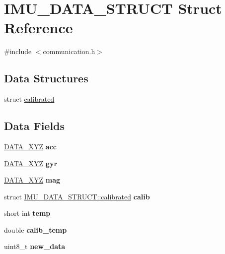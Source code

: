 \hypertarget{structIMU__DATA__STRUCT}{
\section{IMU\_\-DATA\_\-STRUCT Struct Reference}
\label{structIMU__DATA__STRUCT}
}


{\ttfamily \#include $<$communication.h$>$}

\subsection*{Data Structures}
\begin{DoxyCompactItemize}
\item 
struct \hyperlink{structIMU__DATA__STRUCT_1_1calibrated}{calibrated}
\end{DoxyCompactItemize}
\subsection*{Data Fields}
\begin{DoxyCompactItemize}
\item 
\hypertarget{structIMU__DATA__STRUCT_a448f284bf44eb503affda586ad5fa9d2}{
\hyperlink{structDATA__XYZ}{DATA\_\-XYZ} {\bfseries acc}}
\label{structIMU__DATA__STRUCT_a448f284bf44eb503affda586ad5fa9d2}

\item 
\hypertarget{structIMU__DATA__STRUCT_a0c1ac26626e4434a2ee124a1928a23a1}{
\hyperlink{structDATA__XYZ}{DATA\_\-XYZ} {\bfseries gyr}}
\label{structIMU__DATA__STRUCT_a0c1ac26626e4434a2ee124a1928a23a1}

\item 
\hypertarget{structIMU__DATA__STRUCT_a40c7df8b6d49297aa52873cfd9b60daa}{
\hyperlink{structDATA__XYZ}{DATA\_\-XYZ} {\bfseries mag}}
\label{structIMU__DATA__STRUCT_a40c7df8b6d49297aa52873cfd9b60daa}

\item 
\hypertarget{structIMU__DATA__STRUCT_aeffe3c3c5a7191a5cef16e7aab6c3795}{
struct \hyperlink{structIMU__DATA__STRUCT_1_1calibrated}{IMU\_\-DATA\_\-STRUCT::calibrated} {\bfseries calib}}
\label{structIMU__DATA__STRUCT_aeffe3c3c5a7191a5cef16e7aab6c3795}

\item 
\hypertarget{structIMU__DATA__STRUCT_a81e1dbf765c1d947ca6076aa1bbc73e7}{
short int {\bfseries temp}}
\label{structIMU__DATA__STRUCT_a81e1dbf765c1d947ca6076aa1bbc73e7}

\item 
\hypertarget{structIMU__DATA__STRUCT_a3553fcee6beba17fe0c7711ac0483875}{
double {\bfseries calib\_\-temp}}
\label{structIMU__DATA__STRUCT_a3553fcee6beba17fe0c7711ac0483875}

\item 
\hypertarget{structIMU__DATA__STRUCT_a99924252176326418863e511d4fa437b}{
uint8\_\-t {\bfseries new\_\-data}}
\label{structIMU__DATA__STRUCT_a99924252176326418863e511d4fa437b}

\end{DoxyCompactItemize}


